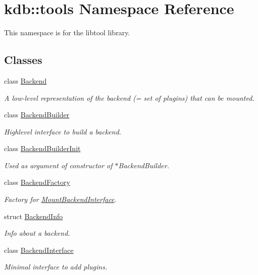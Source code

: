 \hypertarget{namespacekdb_1_1tools}{}\section{kdb\+:\+:tools Namespace Reference}
\label{namespacekdb_1_1tools}


This namespace is for the libtool library.  


\subsection*{Classes}
\begin{DoxyCompactItemize}
\item 
class \hyperlink{classkdb_1_1tools_1_1Backend}{Backend}
\begin{DoxyCompactList}\small\item\em A low-\/level representation of the backend (= set of plugins) that can be mounted. \end{DoxyCompactList}\item 
class \hyperlink{classkdb_1_1tools_1_1BackendBuilder}{Backend\+Builder}
\begin{DoxyCompactList}\small\item\em Highlevel interface to build a backend. \end{DoxyCompactList}\item 
class \hyperlink{classkdb_1_1tools_1_1BackendBuilderInit}{Backend\+Builder\+Init}
\begin{DoxyCompactList}\small\item\em Used as argument of constructor of $\ast$\+Backend\+Builder. \end{DoxyCompactList}\item 
class \hyperlink{classkdb_1_1tools_1_1BackendFactory}{Backend\+Factory}
\begin{DoxyCompactList}\small\item\em Factory for \hyperlink{classkdb_1_1tools_1_1MountBackendInterface}{Mount\+Backend\+Interface}. \end{DoxyCompactList}\item 
struct \hyperlink{structkdb_1_1tools_1_1BackendInfo}{Backend\+Info}
\begin{DoxyCompactList}\small\item\em Info about a backend. \end{DoxyCompactList}\item 
class \hyperlink{classkdb_1_1tools_1_1BackendInterface}{Backend\+Interface}
\begin{DoxyCompactList}\small\item\em Minimal interface to add plugins. \end{DoxyCompactList}\item 

\end{DoxyCompactItemize}
